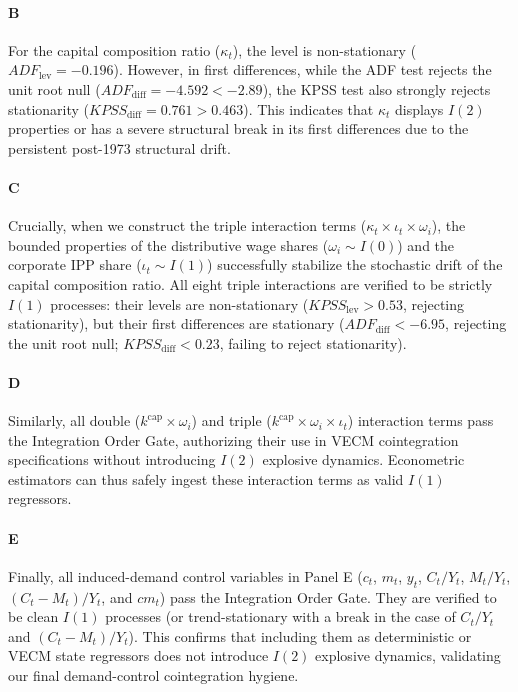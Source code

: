 \documentclass[11pt,a4paper]{article}
\begin{document}
\paragraph{B}
For the capital composition ratio ($\kappa_t$), the level is non-stationary ($ADF_{\text{lev}} = -0.196$). However, in first differences, while the ADF test rejects the unit root null ($ADF_{\text{diff}} = -4.592 < -2.89$), the KPSS test also strongly rejects stationarity ($KPSS_{\text{diff}} = 0.761 > 0.463$). This indicates that $\kappa_t$ displays $I(2)$ properties or has a severe structural break in its first differences due to the persistent post-1973 structural drift.

\paragraph{C}
Crucially, when we construct the triple interaction terms ($\kappa_t \times \iota_t \times \omega_i$), the bounded properties of the distributive wage shares ($\omega_i \sim I(0)$) and the corporate IPP share ($\iota_t \sim I(1)$) successfully stabilize the stochastic drift of the capital composition ratio. All eight triple interactions are verified to be strictly $I(1)$ processes: their levels are non-stationary ($KPSS_{\text{lev}} > 0.53$, rejecting stationarity), but their first differences are stationary ($ADF_{\text{diff}} < -6.95$, rejecting the unit root null; $KPSS_{\text{diff}} < 0.23$, failing to reject stationarity).

\paragraph{D}
Similarly, all double ($k^{\text{cap}} \times \omega_i$) and triple ($k^{\text{cap}} \times \omega_i \times \iota_t$) interaction terms pass the Integration Order Gate, authorizing their use in VECM cointegration specifications without introducing $I(2)$ explosive dynamics. Econometric estimators can thus safely ingest these interaction terms as valid $I(1)$ regressors.

\paragraph{E}
Finally, all induced-demand control variables in Panel E ($c_t$, $m_t$, $y_t$, $C_t/Y_t$, $M_t/Y_t$, $(C_t - M_t)/Y_t$, and $cm_t$) pass the Integration Order Gate. They are verified to be clean $I(1)$ processes (or trend-stationary with a break in the case of $C_t/Y_t$ and $(C_t-M_t)/Y_t$). This confirms that including them as deterministic or VECM state regressors does not introduce $I(2)$ explosive dynamics, validating our final demand-control cointegration hygiene.
\end{document}
